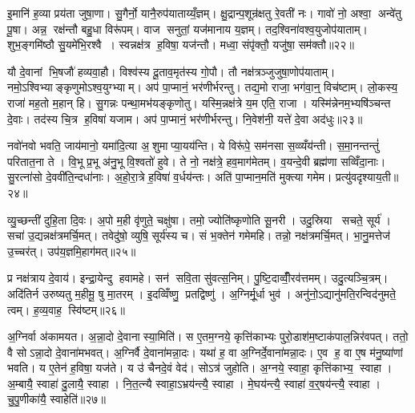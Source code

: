 इ॒मानि॑ ह॒व्या प्रय॑ता जुषा॒णा। सु॒गैर्नो॒ यानै॒रुप॑याताय्यँ॒ज्ञम्। क्षु॒द्रान्प॒शून्र॑क्षतु रे॒वती॑ नः। गावो॑ नो॒ अश्वा॒ अन्वे॑तु पू॒षा। अन्न॒ रक्ष॑न्तौ बहु॒धा विरू॑पम्। वाज सनुतां॒ यज॑मानाय य॒ज्ञम्। तद॒श्विना॑वश्व॒युजोप॑याताम्। शुभ॒ङ्गमि॑ष्ठौ सु॒यमे॑भि॒रश्वै। स्वन्नक्ष॑त्र ह॒विषा॒ यज॑न्तौ। मध्वा॒ संपृ॑क्तौ॒ यजु॑षा॒ सम॑क्तौ॥२२॥

यौ दे॒वानां भि॒षजौ॑ हव्यवा॒हौ। विश्व॑स्य दू॒ताव॒मृत॑स्य गो॒पौ। तौ नक्ष॑त्रञ्जुजुषा॒णोप॑याताम्। नमो॒ऽश्विभ्याङ्कृणुमोऽश्व॒युग्भ्याम्। अप॑ पा॒प्मानं॒ भर॑णीर्भरन्तु। तद्य॒मो राजा॒ भग॑वा॒न्॒ विच॑ष्टाम्। लो॒कस्य॒ राजा॑ मह॒तो म॒हान् हि। सु॒गन्नः पन्था॒मभ॑यङ्कृणोतु। यस्मि॒न्नक्ष॑त्रे य॒म एति॒ राजा। यस्मि॑न्नेनम॒भ्यषि॑ञ्चन्त दे॒वाः। तद॑स्य चि॒त्र ह॒विषा॑ यजाम। अप॑ पा॒प्मानं॒ भर॑णीर्भरन्तु। नि॒वेश॑नी॒ यत्ते॑ दे॒वा अद॑धुः॥२३॥\anuvakamend[त॒तार॒ मह्यं॑ प्रास॒चीर्या यान्तु य॒ज्ञं वाच स्व॒स्ति दे॒वा अनु॑यन्ति॒ सर्वे॒ वाज॑बस्त्यौ॒ सम॑क्तौ दे॒वास्त्रीणि॑ च]

नवो॑नवो भवति॒ जाय॑मानो॒ यमा॑दि॒त्या अ॒शुमाप्या॒यय॑न्ति। ये विरू॑पे॒ सम॑नसा स॒व्व्यँय॑न्ती। स॒मा॒नन्तन्तुं॑ परितात॒ना ते। वि॒भू प्र॒भू अ॑नु॒भू वि॒श्वतो॑ हुवे। ते नो॒ नक्ष॑त्रे॒ हव॒माग॑मेतम्। व॒यन्दे॒वी ब्रह्म॑णा सव्विँदा॒नाः। सु॒रत्ना॑सो दे॒ववी॑ति॒न्दधा॑नाः। अ॒हो॒रा॒त्रे ह॒विषा॑ व॒र्धय॑न्तः। अति॑ पा॒प्मान॒मति॑ मुक्त्या गमेम। प्रत्यु॑वदृश्याय॒ती॥२४॥

व्यु॒च्छन्ती॑ दुहि॒ता दि॒वः। अ॒पो म॒ही वृ॑णुते॒ चक्षु॑षा। तमो॒ ज्योति॑ष्कृणोति सू॒नरी। उदु॒स्रिया सचते॒ सूर्य॑। सचा॑ उ॒द्यन्नक्ष॑त्रमर्चि॒मत्। तवेदु॑षो॒ व्युषि॒ सूर्य॑स्य च। सं भ॒क्तेन॑ गमेमहि। तन्नो॒ नक्ष॑त्रमर्चि॒मत्। भा॒नु॒मत्तेज॑ उ॒च्चर॑त्। उप॑य॒ज्ञमि॒हाग॑मत्॥२५॥

प्र नक्ष॑त्राय दे॒वाय॑। इन्द्रा॒येन्दु हवामहे। सन॑ सवि॒ता सु॑वत्स॒निम्। पु॒ष्टि॒दाव्वीँ॒रव॑त्तमम्। उदु॒त्यञ्चि॒त्रम्। अदि॑तिर्न उरुष्यतु म॒हीमू॒ षु मा॒तरम्। इ॒दव्विँष्णु॒ प्रतद्विष्णु॑। अ॒ग्निर्मू॒र्धा भुव॑। अनु॑नो॒ऽद्यानु॑मति॒रन्विद॑नुमते॒ त्वम्। ह॒व्य॒वाह॒ स्वि॑ष्टम्॥२६॥\anuvakamend[आ॒य॒त्य॑गम॒त्स्वि॑ष्टम्]

अ॒ग्निर्वा अ॑कामयत। अ॒न्ना॒दो दे॒वानास्या॒मिति॑। स ए॒तम॒ग्नये॒ कृत्ति॑काभ्यः पुरो॒डाश॑म॒ष्टाक॑पाल॒न्निर॑वपत्। ततो॒ वै सोऽन्ना॒दो दे॒वाना॑मभवत्। अ॒ग्निर्वै दे॒वाना॑मन्ना॒दः। यथा॑ ह॒ वा अ॒ग्निर्दे॒वाना॑मन्ना॒दः। ए॒व ह॒ वा ए॒ष म॑नु॒ष्या॑णां भवति। य ए॒तेन॑ ह॒विषा॒ यज॑ते। य उ॑ चैनदे॒वं वेद॑। सोऽत्र॑ जुहोति। अ॒ग्नये॒ स्वाहा॒ कृत्ति॑काभ्य॒ स्वाहा। अ॒म्बायै॒ स्वाहा॑ दु॒लायै॒ स्वाहा। नि॒त॒त्न्यै स्वाहा॒ऽभ्रय॑न्त्यै॒ स्वाहा। मे॒घय॑न्त्यै॒ स्वाहा॑ व॒र्॒षय॑न्त्यै॒ स्वाहा। चु॒पु॒णीका॑यै॒ स्वाहेति॑॥२७॥


